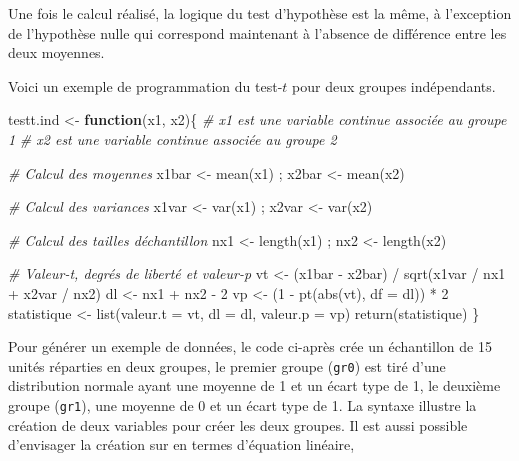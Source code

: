 \documentclass[
]{book}
\newenvironment{Shaded}{}{}
\newcommand{\AttributeTok}[1]{#1}
\newcommand{\CommentTok}[1]{\textit{#1}}
\newcommand{\ControlFlowTok}[1]{\textbf{#1}}
\newcommand{\DecValTok}[1]{#1}
\newcommand{\FunctionTok}[1]{#1}
\newcommand{\NormalTok}[1]{#1}
\newcommand{\OtherTok}[1]{#1}
\newcommand{\SpecialCharTok}[1]{#1}
\begin{document}
Une fois le calcul réalisé, la logique du test d'hypothèse est la même, à l'exception de l'hypothèse nulle qui correspond maintenant à l'absence de différence entre les deux moyennes.

Voici un exemple de programmation du test-\(t\) pour deux groupes indépendants.

\begin{Shaded}
\begin{Highlighting}[]
\NormalTok{testt.ind }\OtherTok{\textless{}{-}} \ControlFlowTok{function}\NormalTok{(x1, x2)\{}
  \CommentTok{\# x1 est une variable continue associée au groupe 1}
  \CommentTok{\# x2 est une variable continue associée au groupe 2}
  
  \CommentTok{\# Calcul des moyennes}
\NormalTok{  x1bar }\OtherTok{\textless{}{-}} \FunctionTok{mean}\NormalTok{(x1) ; x2bar }\OtherTok{\textless{}{-}} \FunctionTok{mean}\NormalTok{(x2)}
  
  \CommentTok{\# Calcul des variances}
\NormalTok{  x1var }\OtherTok{\textless{}{-}} \FunctionTok{var}\NormalTok{(x1) ; x2var }\OtherTok{\textless{}{-}} \FunctionTok{var}\NormalTok{(x2)}
  
  \CommentTok{\# Calcul des tailles d\textquotesingle{}échantillon}
\NormalTok{  nx1 }\OtherTok{\textless{}{-}} \FunctionTok{length}\NormalTok{(x1) ; nx2 }\OtherTok{\textless{}{-}} \FunctionTok{length}\NormalTok{(x2)}
  
  \CommentTok{\# Valeur{-}t, degrés de liberté et valeur{-}p}
\NormalTok{  vt }\OtherTok{\textless{}{-}}\NormalTok{ (x1bar }\SpecialCharTok{{-}}\NormalTok{ x2bar) }\SpecialCharTok{/} \FunctionTok{sqrt}\NormalTok{(x1var }\SpecialCharTok{/}\NormalTok{ nx1 }\SpecialCharTok{+}\NormalTok{ x2var }\SpecialCharTok{/}\NormalTok{ nx2)}
\NormalTok{  dl }\OtherTok{\textless{}{-}}\NormalTok{ nx1 }\SpecialCharTok{+}\NormalTok{ nx2 }\SpecialCharTok{{-}} \DecValTok{2}
\NormalTok{  vp }\OtherTok{\textless{}{-}}\NormalTok{ (}\DecValTok{1} \SpecialCharTok{{-}} \FunctionTok{pt}\NormalTok{(}\FunctionTok{abs}\NormalTok{(vt), }\AttributeTok{df =}\NormalTok{ dl)) }\SpecialCharTok{*} \DecValTok{2} 
\NormalTok{  statistique }\OtherTok{\textless{}{-}} \FunctionTok{list}\NormalTok{(}\AttributeTok{valeur.t =}\NormalTok{ vt, }\AttributeTok{dl =}\NormalTok{ dl, }\AttributeTok{valeur.p =}\NormalTok{ vp)}
  \FunctionTok{return}\NormalTok{(statistique)}
\NormalTok{\}}
\end{Highlighting}
\end{Shaded}

Pour générer un exemple de données, le code ci-après crée un échantillon de 15 unités réparties en deux groupes, le premier groupe (\texttt{gr0}) est tiré d'une distribution normale ayant une moyenne de 1 et un écart type de 1, le deuxième groupe (\texttt{gr1}), une moyenne de 0 et un écart type de 1. La syntaxe illustre la création de deux variables pour créer les deux groupes. Il est aussi possible d'envisager la création sur en termes d'équation linéaire,
\end{document}
